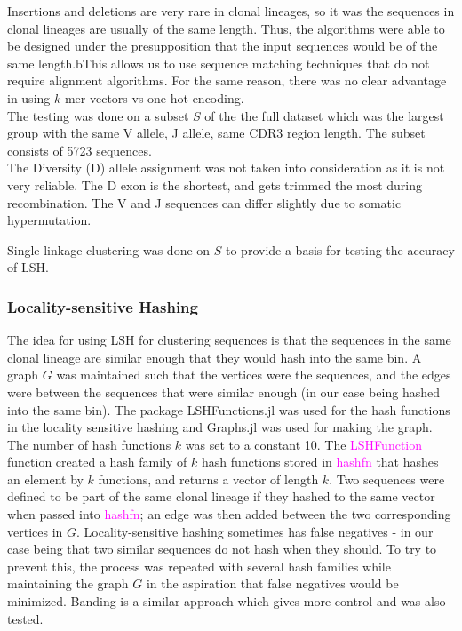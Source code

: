 \documentclass[times, twoside, watermark]{zHenriquesLab-StyleBioRxiv}
\begin{document}
Insertions and deletions are very rare in clonal lineages, so it was the sequences in clonal lineages are usually of the same length. Thus, the algorithms were able to be designed under the presupposition that the input sequences would be of the same length.bThis allows us to use sequence matching techniques that do not require alignment algorithms. For the same reason, there was no clear advantage in using $k$-mer vectors vs one-hot encoding. \\

The testing was done on a subset $S$ of the the full dataset which was the largest group with the same V allele, J allele, same CDR3 region length. The subset consists of 5723 sequences. \\

The Diversity (D) allele assignment was not taken into consideration as it is not very reliable. The D exon is the shortest, and gets trimmed the most during recombination. The V and J sequences can differ slightly due to somatic hypermutation.

Single-linkage clustering was done on $S$ to provide a basis for testing the accuracy of LSH. 


\subsubsection{Locality-sensitive Hashing}
The idea for using LSH for clustering sequences is that the sequences in the same clonal lineage are similar enough that they would hash into the same bin. A graph $G$ was maintained such that the vertices were the sequences, and the edges were between the sequences that were similar enough (in our case being hashed into the same bin). The package LSHFunctions.jl was used for the hash functions in the locality sensitive hashing and Graphs.jl was used for making the graph. \\

The number of hash functions $k$ was set to a constant 10. The \textcolor{magenta}{LSHFunction} function created a hash family of $k$ hash functions stored in \textcolor{magenta}{hashfn} that hashes an element by $k$ functions, and returns a vector of length $k$. Two sequences were defined to be part of the same clonal lineage if they hashed to the same vector when passed into \textcolor{magenta}{hashfn}; an edge was then added between the two corresponding vertices in $G$. Locality-sensitive hashing sometimes has false negatives - in our case being that two similar sequences do not hash when they should. To try to prevent this, the process was repeated with several hash families while maintaining the graph $G$ in the aspiration that false negatives would be minimized. Banding is a similar approach which gives more control and was also tested. \\ %
\end{document}
